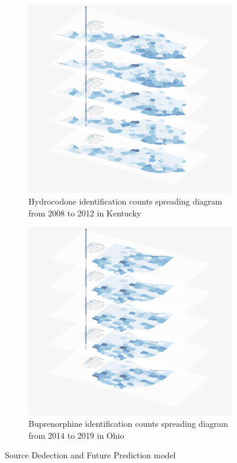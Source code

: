 \documentclass{mcmthesis}
\begin{document}
\begin{figure}[H]
    \centering
    \begin{subfigure}[b]{0.49\textwidth}
        \includegraphics[width=\textwidth]{../figure/KY_Hydrocodone} 
	\caption{Hydrocodone identification counts spreading diagram from 2008 to 2012 in  Kentucky} 
	\label{KY_Hydrocodone}  
    \end{subfigure}\hfill
    \begin{subfigure}[b]{0.49\textwidth}
        \includegraphics[width=\textwidth]{../figure/OH_Buprenorphine} 
	\caption{Buprenorphine identification counts spreading diagram from 2014 to 2019 in Ohio} 
	\label{OH_Buprenorphine}  
    \end{subfigure}
    \caption{ Source Dedection and Future Prediction model }\label{fig:cool}
\end{figure}
\end{document}

